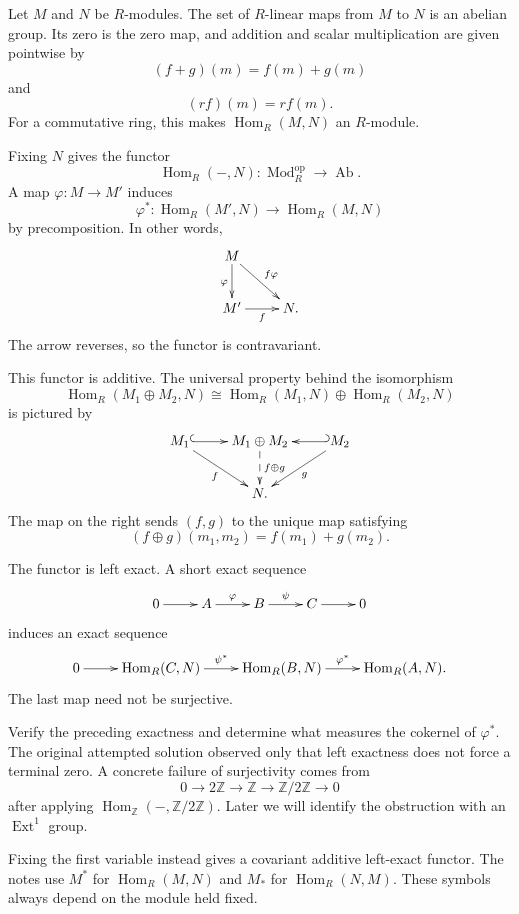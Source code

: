 \noindent
Let $M$ and $N$ be $R$-modules.  The set
of $R$-linear maps from $M$ to $N$ is an
abelian group.  Its zero is the zero map,
and addition and scalar multiplication are
given pointwise by
$$
(f+g)(m)=f(m)+g(m)
$$
and
$$
(rf)(m)=r f(m).
$$
For a commutative ring, this makes
$\operatorname{Hom}_R(M,N)$ an $R$-module.

\noindent
Fixing $N$ gives the functor
$$
\operatorname{Hom}_R(-,N):
\operatorname{Mod}_R^{\mathrm{op}}
\longrightarrow\operatorname{Ab}.
$$
A map $\varphi:M\to M'$ induces
$$
\varphi^*:
\operatorname{Hom}_R(M',N)
\longrightarrow
\operatorname{Hom}_R(M,N)
$$
by precomposition.  In other words,
$$
\xymatrix{
M \ar[d]_\varphi
  \ar[rd]^{f\varphi} \\
M' \ar[r]_-f
  & N.
}
$$
The arrow reverses, so the functor is
contravariant.

\noindent
This functor is additive.  The universal
property behind the isomorphism
$$
\operatorname{Hom}_R(M_1\oplus M_2,N)
\cong
\operatorname{Hom}_R(M_1,N)
\oplus
\operatorname{Hom}_R(M_2,N)
$$
is pictured by
$$
\xymatrix{
M_1 \ar@{^{(}->}[r]
  \ar[rd]_f
  & M_1\oplus M_2
    \ar@{-->}[d]^{f\oplus g}
  & M_2 \ar@{_{(}->}[l]
    \ar[ld]^g \\
  & N.
}
$$
The map on the right sends $(f,g)$ to the
unique map satisfying
$$
(f\oplus g)(m_1,m_2)
=f(m_1)+g(m_2).
$$

\noindent
The functor is left exact.  A short exact
sequence
$$
\xymatrix{
0 \ar[r]
  & A \ar[r]^-\varphi
  & B \ar[r]^-\psi
  & C \ar[r]
  & 0
}
$$
induces an exact sequence
$$
\xymatrix{
0 \ar[r]
  & \operatorname{Hom}_R(C,N)
    \ar[r]^-{\psi^*}
  & \operatorname{Hom}_R(B,N)
    \ar[r]^-{\varphi^*}
  & \operatorname{Hom}_R(A,N).
}
$$
The last map need not be surjective.

\begin{exercise}
\label{at-exercise-hom-left-exact}
Verify the preceding exactness and determine
what measures the cokernel of
$\varphi^*$.  The original attempted
solution observed only that left exactness
does not force a terminal zero.  A concrete
failure of surjectivity comes from
$$
0\longrightarrow2\mathbb{Z}
\longrightarrow\mathbb{Z}
\longrightarrow\mathbb{Z}/2\mathbb{Z}
\longrightarrow0
$$
after applying
$\operatorname{Hom}_{\mathbb{Z}}(-,
\mathbb{Z}/2\mathbb{Z})$.
Later we will identify the obstruction with
an $\operatorname{Ext}^1$ group.
\end{exercise}

\begin{remark}
\label{at-remark-hom-second-variable}
Fixing the first variable instead gives a
covariant additive left-exact functor.  The
notes use $M^*$ for
$\operatorname{Hom}_R(M,N)$ and $M_*$ for
$\operatorname{Hom}_R(N,M)$.  These symbols
always depend on the module held fixed.
\end{remark}

